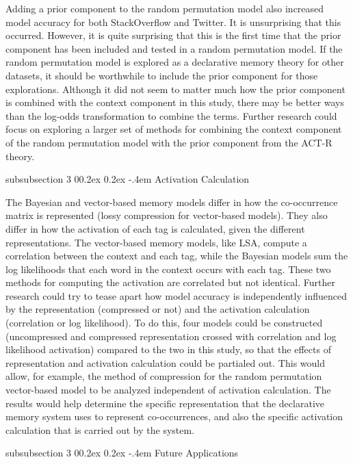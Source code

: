 \documentclass[man,floatsintext,donotrepeattitle]{apa6}
\makeatletter
\renewcommand{\subsubsection}{%
  \@startsection
  {subsubsection}%
  {3}%
  {\parindent}%
  {0\baselineskip \@plus 0.2ex \@minus 0.2ex}%
  {-.4em}%
  {\normalfont\normalsize\bfseries\addperi}}
\makeatother
\begin{document}
Adding a prior component to the random permutation model also increased model accuracy for both StackOverflow and Twitter.
It is unsurprising that this occurred.
However, it is quite surprising that this is the first time that the prior component has been included and tested in a random permutation model.
If the random permutation model is explored as a declarative memory theory for other datasets, it should be worthwhile to include the prior component for those explorations.
Although it did not seem to matter much how the prior component is combined with the context component in this study, 
there may be better ways than the log-odds transformation to combine the terms.
Further research could focus on exploring a larger set of methods for combining the context component of the random permutation model with the prior component from the ACT-R theory.

\subsubsection{Activation Calculation}

The Bayesian and vector-based memory models differ in how the co-occurrence matrix is represented (lossy compression for vector-based models).
They also differ in how the activation of each tag is calculated, given the different representations.
The vector-based memory models, like LSA, compute a correlation between the context and each tag, while the Bayesian models sum the log likelihoods that each word in the context occurs with each tag.
These two methods for computing the activation are correlated but not identical.
Further research could try to tease apart how model accuracy is independently influenced by the representation (compressed or not) and the activation calculation (correlation or log likelihood).
To do this, four models could be constructed (uncompressed and compressed representation crossed with correlation and log likelihood activation) compared to the two in this study,
so that the effects of representation and activation calculation could be partialed out.
This would allow, for example, the method of compression for the random permutation vector-based model to be analyzed independent of activation calculation.
The results would help determine the specific representation that the declarative memory system uses to represent co-occurrences,
and also the specific activation calculation that is carried out by the system.

\subsubsection{Future Applications}
\end{document}

